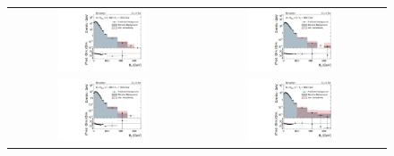 \begin{figure}[!hp]
  \centering
  \begin{tabular}{cc}
                \includegraphics[width=0.49\textwidth]{figures/MHT_JetBin2_HTlow_madgraph_DR53X_chs_TuneZ2star_pt10_withoutPUReweighting_UseRebCorrection_v1.pdf} &
                \includegraphics[width=0.49\textwidth]{figures/MHT_JetBin2_HThigh_madgraph_DR53X_chs_TuneZ2star_pt10_withoutPUReweighting_UseRebCorrection_v1.pdf}\\
                \includegraphics[width=0.49\textwidth]{figures/MHT_JetBin3_HTlow_madgraph_DR53X_chs_TuneZ2star_pt10_withoutPUReweighting_UseRebCorrection_v1.pdf} &
                \includegraphics[width=0.49\textwidth]{figures/MHT_JetBin3_HThigh_madgraph_DR53X_chs_TuneZ2star_pt10_withoutPUReweighting_UseRebCorrection_v1.pdf}\\

\end{tabular}
\end{figure}
